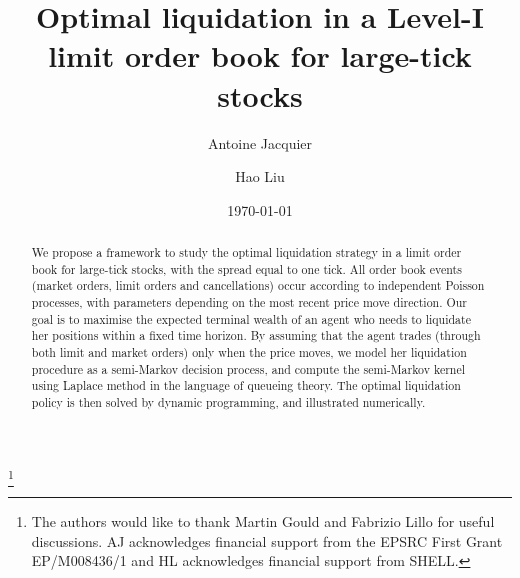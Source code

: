 \documentclass{amsart}[11pt]
\numberwithin{equation}{section}
\theoremstyle{definition}
\begin{document}
\title{Optimal liquidation in a Level-I limit order book for large-tick stocks}
\date{\today}
\author{Antoine Jacquier}
\address{Department of Mathematics, Imperial College London}
\author{Hao Liu}
\address{Department of Mathematics, Imperial College London}

\thanks{The authors would like to thank Martin Gould and Fabrizio Lillo for useful discussions.
AJ acknowledges financial support from the EPSRC First Grant EP/M008436/1 and 
HL acknowledges financial support from SHELL.
}

\maketitle

\begin{abstract}
We propose a framework to study the optimal liquidation strategy in a limit order book for large-tick stocks, 
with the spread equal to one tick. 
All order book events (market orders, limit orders and cancellations) occur according to independent Poisson processes, with parameters depending on the most recent price move direction.
Our goal is to maximise the expected terminal wealth of an agent who needs to liquidate her positions within a fixed time horizon.
By assuming that the agent trades (through both limit and market orders) only when the price moves, 
we model her liquidation procedure as a semi-Markov decision process, 
and compute the semi-Markov kernel using Laplace method in the language of queueing theory. 
The optimal liquidation policy is then solved by dynamic programming,
and illustrated numerically. 
\end{abstract}
\end{document}
